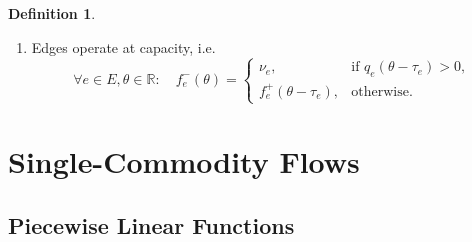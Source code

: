 \documentclass[titlepage]{scrartcl}
\theoremstyle{definition}
\newtheorem{definition}[theorem]{Definition}
\newcommand{\R}{\mathbb{R}}
\newcommand{\capa}{\nu}
\newcommand{\transit}{\tau}
\newcommand{\infl}[1][f]{{#1}^+}
\newcommand{\outfl}[1][f]{{#1}^-}
\newcommand{\qulen}{q}
\begin{document}
\begin{definition}
\begin{enumerate}[label=(F\arabic*)]
            \item Edges operate at capacity, i.e. 
            \[
                \forall e\in E, \theta\in \R: \quad \outfl_{e}(\theta) = \begin{cases}
                    \capa_e, &\text{if $\qulen_e(\theta - \transit_e)>0$,} \\
                    \infl_e(\theta-\transit_e), &\text{otherwise.}
                \end{cases}
            \]
        \end{enumerate}
        
    \end{definition}
        

    \newpage
    \section{Single-Commodity Flows}

    \subsection{Piecewise Linear Functions}
\end{document}
